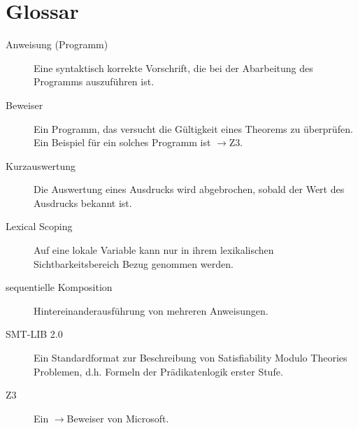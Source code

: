 \documentclass[a4paper,10pt]{article}
\begin{document}
\section{Glossar}
\begin{description}
\item[Anweisung (Programm)] Eine syntaktisch korrekte Vorschrift, die bei der Abarbeitung des Programms auszuführen ist.
\item[Beweiser] Ein Programm, das versucht die Gültigkeit eines Theorems zu überprüfen. Ein Beispiel für ein solches Programm ist $\to$Z3.
\item[Kurzauswertung] Die Auswertung eines Ausdrucks wird abgebrochen, sobald der Wert des Ausdrucks bekannt ist.
\item[Lexical Scoping] Auf eine lokale Variable kann nur in ihrem lexikalischen Sichtbarkeitsbereich Bezug genommen werden.
\item[sequentielle Komposition] Hintereinanderausführung von mehreren Anweisungen.
\item[SMT-LIB 2.0] Ein Standardformat zur Beschreibung von Satisfiability Modulo Theories Problemen, d.h. Formeln der Prädikatenlogik erster Stufe.
\item[Z3] Ein $\to$Beweiser von Microsoft.
\end{description}
\end{document}
